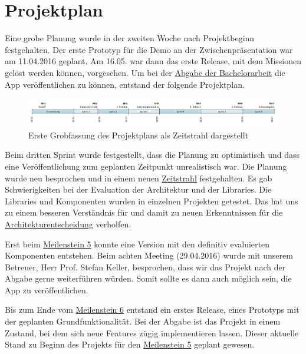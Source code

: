 

\section{Projektplan}
\label{pm-projektplan}

Eine grobe Planung wurde in der zweiten Woche nach Projektbeginn festgehalten. 
Der erste Prototyp für die Demo an der Zwischenpräsentation war am 11.04.2016 geplant. 
Am 16.05. war dann das erste Release, mit dem Missionen gelöst werden können, vorgesehen. 
Um bei der \hyperref[pm-projektmanagement-risikomanagement-r01]{Abgabe der Bachelorarbeit} die App veröffentlichen zu können, entstand der folgende Projektplan.

\begin{figure}[H]
	\centering
	\includegraphics[width=\textwidth]{images/projektmanagement/zeitstrahl_v1.png}
	\caption{Erste Grobfassung des Projektplans als Zeitstrahl dargestellt}
	\label{image-project-plan-timeline1}
\end{figure}

Beim dritten Sprint wurde festgestellt, dass die Planung zu optimistisch und dass eine Veröffentlichung zum geplanten Zeitpunkt unrealistisch war. 
Die Planung wurde neu besprochen und in einem neuen \hyperref[image-project-plan-timeline2]{Zeitstrahl} festgehalten. 
Es gab Schwierigkeiten bei der Evaluation der Architektur und der Libraries. 
Die Libraries und Komponenten wurden in einzelnen Projekten getestet. 
Das hat uns zu einem besseren Verständnis für  und damit zu neuen Erkenntnissen für die \hyperref[tb-evaluation-architektur]{Architekturentscheidung} verholfen. 

Erst beim \hyperref[pm-ms5]{Meilenstein 5} konnte eine Version mit den definitiv evaluierten Komponenten entstehen. 
Beim achten Meeting (29.04.2016) wurde mit unserem Betreuer, Herr Prof. Stefan Keller, besprochen, dass wir das Projekt nach der Abgabe gerne weiterführen würden.
Somit sollte es dann auch möglich sein, die App zu veröffentlichen.

Bis zum Ende vom \hyperref[pm-ms6]{Meilenstein 6} entstand ein erstes Release, eines Prototyps mit der geplanten Grundfunktionalität. 
Bei der Abgabe ist das Projekt in einem Zustand, bei dem sich neue Features zügig implementieren lassen.
Dieser aktuelle Stand zu Beginn des Projekts für den \hyperref[pm-ms5]{Meilenstein 5} geplant gewesen.

